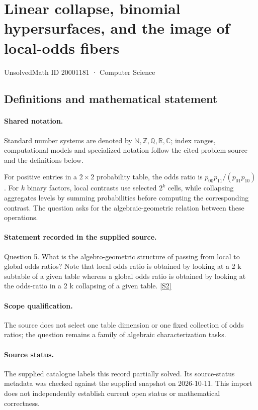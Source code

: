 \documentclass[11pt]{article}
\newcommand{\sref}[2]{\hyperlink{source:#1:#2}{[S#2]}}
\begin{document}
\setcounter{section}{20001180}
\section{Linear collapse, binomial hypersurfaces, and the image of local-odds fibers}\label{20001181}
{\small\sffamily UnsolvedMath ID 20001181 · Computer Science}
\subsection{Definitions and mathematical statement}

\paragraph{Shared notation.}Standard number systems are denoted by $\mathbb N,\mathbb Z,\mathbb Q,\mathbb R,\mathbb C$; index ranges, computational models and specialized notation follow the cited problem source and the definitions below.


For positive entries in a $2\times2$ probability table, the odds ratio is $p_{00}p_{11}/(p_{01}p_{10})$. For $k$ binary factors, local contrasts use selected $2^k$ cells, while collapsing aggregates levels by summing probabilities before computing the corresponding contrast. The question asks for the algebraic-geometric relation between these operations.
\paragraph{Statement recorded in the supplied source.}
Question 5. What is the algebro-geometric structure of passing from local to global odds ratios? Note that local odds ratio is obtained by looking at a 2 k subtable of a given table whereas a global odds ratio is obtained by looking at the odds-ratio in a 2 k collapsing of a given table. \sref{20001181}{2}
\paragraph{Scope qualification.}
The source does not select one table dimension or one fixed collection of odds ratios; the question remains a family of algebraic characterization tasks.
\paragraph{Source status.}
The supplied catalogue labels this record partially solved. Its source-status metadata was checked against the supplied snapshot on 2026-10-11. This import does not independently establish current open status or mathematical correctness.
\end{document}
